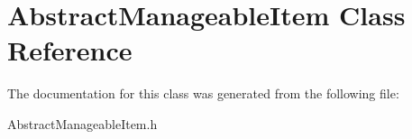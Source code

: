 \hypertarget{class_abstract_manageable_item}{}\section{Abstract\+Manageable\+Item Class Reference}
\label{class_abstract_manageable_item}


The documentation for this class was generated from the following file\+:\begin{DoxyCompactItemize}
\item 
Abstract\+Manageable\+Item.\+h\end{DoxyCompactItemize}
